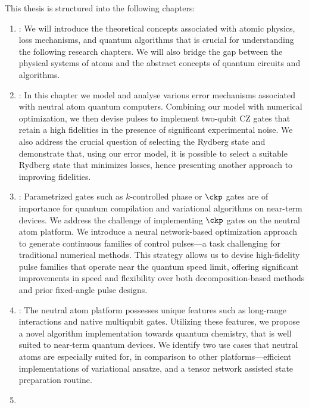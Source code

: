 \documentclass[main.tex]{subfiles}
\begin{document}
This thesis is structured into the following chapters: 
\begin{enumerate}
  \item \textit{\textbf{\textcolor{DeepPineGreen}{}}}: We will introduce the theoretical concepts associated with atomic physics, loss mechanisms, and quantum algorithms that is crucial for understanding the following research chapters. We will also bridge the gap between the physical systems of atoms and the abstract concepts of quantum circuits and algorithms.

  \item \textit{\textbf{\textcolor{DeepPineGreen}{}}}: In this chapter we model and analyse various error mechanisms associated with neutral atom quantum computers. Combining our model with numerical optimization, we then devise pulses to implement two-qubit $\mathrm{CZ}$ gates that retain a high fidelities in the presence of significant experimental noise. We also address the crucial question of selecting the Rydberg state and demonstrate that, using our error model, it is possible to select a suitable Rydberg state that minimizes losses, hence presenting another approach to improving fidelities.  
  \item\textit{\textbf{\textcolor{DeepPineGreen}{}}}: Parametrized gates such as $k$-controlled phase or $\ckp$ gates are of importance for quantum compilation and variational algorithms on near-term devices. We address the challenge of implementing $\ckp$ gates on the neutral atom platform. We introduce a neural network-based optimization approach to generate continuous families of control pulses---a task challenging for traditional numerical methods. This strategy allows us to devise high-fidelity pulse families that operate near the quantum speed limit, offering significant improvements in speed and flexibility over both decomposition-based methods and prior fixed-angle pulse designs.
  \item \textit{\textbf{\textcolor{DeepPineGreen}{}}}: The neutral atom platform possesses unique features such as long-range interactions and native multiqubit gates. Utilizing these features, we propose a novel algorithm implementation towards quantum chemistry, that is well suited to near-term quantum devices. We identify two use cases that neutral atoms are especially suited for, in comparison to other platforms---efficient implementations of variational ansatze, and a tensor network assisted state preparation routine. 
  \item \textit{\textbf{\textcolor{DeepPineGreen}{}}}
\end{enumerate}
\end{document}
